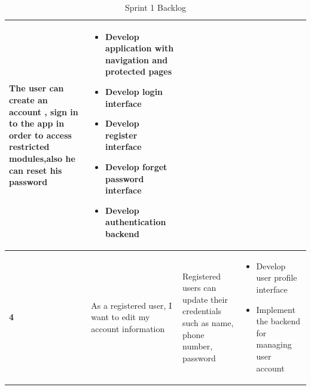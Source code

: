 \begin{table}[H]
\begin{tabular}{|p{}|p{}|p{}|p{}|}
  The  user can create an account , sign in to the app in order to access restricted modules,also he can reset his password  & 

       \begin{itemize}[left=0pt, label={\textbf{\Huge .}}]
            \item Develop application with navigation and protected pages
            \item Develop login interface
            \item Develop register interface
            \item Develop forget password interface
            \item Develop authentication backend
        \end{itemize} \\ \hline
\begin{center}
       \textbf{4}
\end{center} & \begin{center}
       As a registered user, I want to edit my account information
   \end{center} &Registered users can update their credentials such as name, phone number, password 
   &
   \begin{itemize}[left=0pt, label={\textbf{\Huge .}}]
            \item Develop user profile interface
            \item Implement the backend for managing user account 
            \end{itemize} \\ \hline
\end{tabular}
       \caption{Sprint 1 Backlog}
        \label{tab:my_label}
    
\end{table}

